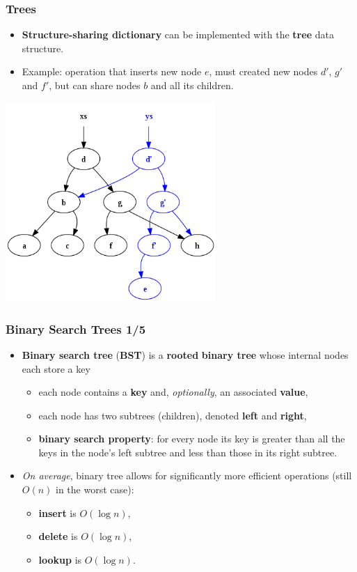 \documentclass{beamer}
\begin{document}
\begin{frame}[fragile]
  \frametitle{Trees}
  \begin{itemize}
  \item \textbf{Structure-sharing dictionary} can be implemented with the
    \textbf{tree} data structure.
  \item Example: operation that inserts new node $e$, must created new nodes
    $d'$, $g'$ and $f'$, but can share nodes $b$ and all its children.
  \end{itemize}
  \begin{center}
    \includegraphics[width=0.6\textwidth]{bst.png}
  \end{center}
\end{frame}

\begin{frame}[fragile]
  \frametitle{Binary Search Trees 1/5}
  \begin{itemize}
  \item \textbf{Binary search tree} (\textbf{BST}) is a \textbf{rooted}
    \textbf{binary tree} whose internal nodes each store a key
    \begin{itemize}
    \item each node contains a \textbf{key} and, \textit{optionally}, an
      associated \textbf{value},
    \item each node has two subtrees (children), denoted \textbf{left} and
      \textbf{right},
    \item \textbf{binary search property}: for every node its key is greater
      than all the keys in the node's left subtree and less than those in its
      right subtree.
    \end{itemize}
  \item \textit{On average}, binary tree allows for significantly more efficient
    operations (still $O(n)$ in the worst case):
    \begin{itemize}
    \item \textbf{insert} is $O(\log{n})$,
    \item \textbf{delete} is $O(\log{n})$,
    \item \textbf{lookup} is $O(\log{n})$.
    \end{itemize}
  \end{itemize}
\end{frame}
\end{document}
